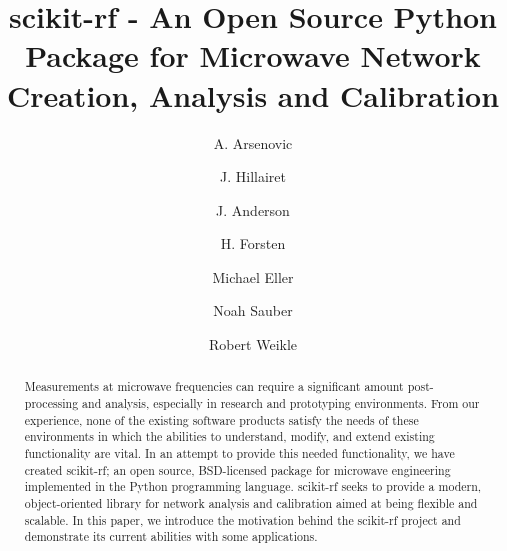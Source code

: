 \documentclass{IEEEjmw}
\begin{document}

\title{scikit-rf - An Open Source Python Package for Microwave Network Creation, Analysis and Calibration} 


\author{A. Arsenovic}

%

\author{J. Hillairet}

\author{J. Anderson}

\author{H. Forsten}

\author{Michael Eller}

\author{Noah Sauber}

\author{Robert Weikle}






\begin{abstract}
Measurements at microwave frequencies can require a  significant  amount post-processing  and  analysis,  especially  in research  and  prototyping environments.  From  our  experience, none  of   the   existing   software   products  satisfy   the   needs   of these environments in which the abilities to understand, modify, and  extend  existing  functionality  are  vital.  In  an  attempt  to provide this  needed  functionality,  we  have  created  scikit-rf;  an open  source,  BSD-licensed  package  for  microwave  engineering implemented   in   the   Python  programming   language.   scikit-rf seeks  to  provide  a  modern,  object-oriented  library  for  network analysis  and  calibration  aimed  at  being  flexible  and scalable. In  this  paper,  we  introduce  the  motivation  behind  the  scikit-rf  project   and   demonstrate  its  current   abilities   with   some applications.
\end{abstract}
\end{document}
